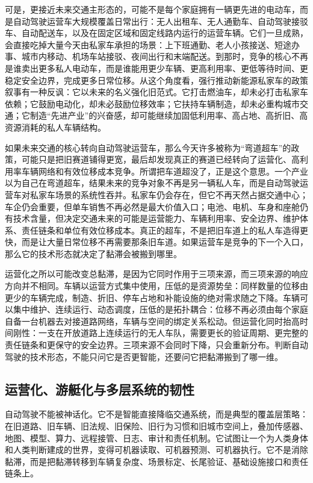 可是，更接近未来交通主形态的，可能不是每个家庭拥有一辆更先进的电动车，而是自动驾驶运营车大规模覆盖日常出行：无人出租车、无人通勤车、自动驾驶接驳车、自动配送车，以及在固定区域和固定线路内运行的运营车辆。它们一旦成熟，会直接吃掉大量今天由私家车承担的场景：上下班通勤、老人小孩接送、短途办事、城市内移动、机场车站接驳、夜间出行和末端配送。到那时，竞争的核心不再是谁卖出更多私人电动车，而是谁能用更少车辆、更高利用率、更低等待时间、更稳定安全边界，完成更多日常位移。从这个角度看，强行推动新能源私家车的政策叙事有一种反讽：它以未来的名义强化旧范式。它打击燃油车，却未必打击私家车依赖；它鼓励电动化，却未必鼓励位移效率；它扶持车辆制造，却未必重构城市交通；它制造“先进产业”的兴奋感，却可能继续加固低利用率、高占地、高折旧、高资源消耗的私人车辆结构。

如果未来交通的核心转向自动驾驶运营车，那么今天许多被称为“弯道超车”的政策，可能只是把旧赛道铺得更宽，最后却发现真正的赛道已经转向了运营化、高利用率车辆网络和有效位移成本竞争。所谓把车道超没了，正是这个意思。一个产业以为自己在弯道超车，结果未来的竞争对象不再是另一辆私人车，而是自动驾驶运营车对私家车场景的系统性吞并。私家车仍会存在，但它不再天然占据交通中心；车企仍会重要，但单车销售不再必然是最大价值入口；电池、电机、车身和座舱仍有技术含量，但决定交通未来的可能是运营能力、车辆利用率、安全边界、维护体系、责任链条和单位有效位移成本。真正的超车，不是把旧车道上的私人车造得更快，而是让大量日常位移不再需要那条旧车道。如果运营车是竞争的下一个入口，那么它的技术形态就决定了黏滞会被搬到哪里。

运营化之所以可能改变总黏滞，是因为它同时作用于三项来源，而三项来源的响应方向并不相同。车辆以运营方式集中使用，压低的是资源势垒：同样数量的位移由更少的车辆完成，制造、折旧、停车占地和补能设施的绝对需求随之下降。车辆可以集中维护、连续运行、动态调度，压低的是拓扑耦合：位移不再必须由每个家庭自备一台机器去对接道路网络，车辆与空间的绑定关系松动。但运营化同时抬高时间刚性：一支在开放道路上连续运行的无人车队，需要更长的验证周期、更完整的责任链条和更保守的安全边界。三项来源不会同时下降，只会重新分布。判断自动驾驶的技术形态，不能只问它是否更智能，还要问它把黏滞搬到了哪一维。

\subsection{运营化、游艇化与多层系统的韧性}


自动驾驶不能被神话化。它不是智能直接降临交通系统，而是典型的覆盖层策略：在旧道路、旧车辆、旧法规、旧保险、旧行为习惯和旧城市空间上，叠加传感器、地图、模型、算力、远程接管、日志、审计和责任机制。它试图让一个为人类身体和人类判断建成的世界，变得可机器读取、可机器预测、可机器执行。它不是消除黏滞，而是把黏滞转移到车辆复杂度、场景标定、长尾验证、基础设施接口和责任链条上。

